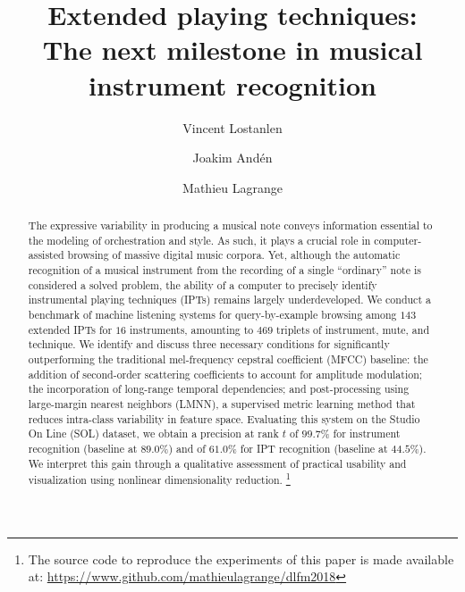 \documentclass[sigconf]{acmart}
\begin{document}
\title{Extended playing techniques:\\
The next milestone in musical instrument recognition}

\author{Vincent Lostanlen}

\author{Joakim And\'{e}n}

\author{Mathieu Lagrange}

\renewcommand{\shortauthors}{V. Lostanlen et al.}

\newcommand\blfootnote[1]{%
  \begingroup
  \renewcommand\thefootnote{}\footnote{#1}%
  \addtocounter{footnote}{-1}%
  \endgroup
}


\begin{abstract}
The expressive variability in producing a musical note conveys information essential to the modeling of orchestration and style.
As such, it plays a crucial role in computer-assisted browsing of massive digital music corpora.
Yet, although the automatic recognition of a musical instrument from the recording of a single ``ordinary'' note is considered a solved problem, the ability of a computer to precisely identify instrumental playing techniques (IPTs) remains largely underdeveloped.
We conduct a benchmark of machine listening systems for query-by-example browsing among $143$ extended IPTs for $16$ instruments, amounting to $469$ triplets of instrument, mute, and technique. We identify and discuss three necessary conditions for significantly outperforming the traditional mel-frequency cepstral coefficient (MFCC) baseline: the addition of second-order scattering coefficients to account for amplitude modulation; the incorporation of long-range temporal dependencies; and post-processing using large-margin nearest neighbors (LMNN), a supervised metric learning method that reduces intra-class variability in feature space.
Evaluating this system on the Studio On Line (SOL) dataset, we obtain a precision at rank $t$ of $99.7\%$ for instrument recognition (baseline at $89.0\%$) and of $61.0\%$ for IPT recognition (baseline at $44.5\%$).
We interpret this gain through a qualitative assessment of practical usability and visualization using nonlinear dimensionality reduction.
\blfootnote{
The source code to reproduce the experiments of this paper is made available at: \url{https://www.github.com/mathieulagrange/dlfm2018}}
\end{abstract}
\end{document}
